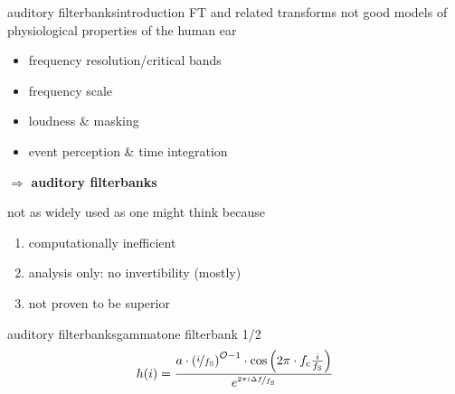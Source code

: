         \begin{frame}{auditory filterbanks}{introduction}
            FT and related transforms not good models of physiological properties of the human ear
                \begin{itemize}
                    \item   frequency resolution/critical bands
                    \item   frequency scale
                    \item   loudness \& masking
                    \item   event perception \&  time integration
                \end{itemize}
            
            $\Rightarrow$ \textbf{auditory filterbanks}
            
            \pause
            \bigskip
            not as widely used as one might think because
            
            \begin{enumerate}
                \item<3->	computationally inefficient
                \item<4->	analysis only: no invertibility (mostly)
                \item<5->	not proven to be superior
            \end{enumerate}
        \end{frame}	

        \begin{frame}{auditory filterbanks}{gammatone filterbank 1/2}
            \vspace{-3mm}
            \begin{equation*}
                h(i) = \frac{ a \cdot\left(\nicefrac{i}{f_{\mathrm{S}}}\right)^{\mathcal{O}-1}\cdot \cos\left( 2\pi \cdot f_{\mathrm{c}} \frac{ i}{f_{\mathrm{S}}} \right) }{{e}^{\nicefrac{2\pi i \Delta f}{f_{\mathrm{S}}}}}
            \end{equation*}
            \vspace{-3mm}
        \end{frame}	

